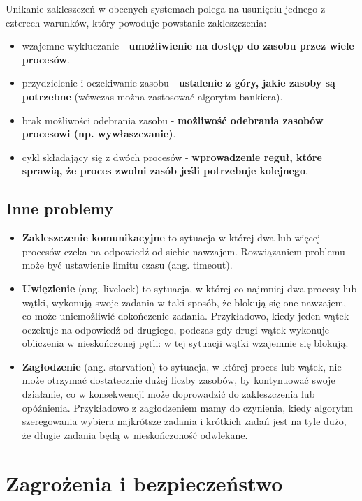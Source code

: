 \documentclass{article}
\begin{document}
Unikanie zakleszczeń w obecnych systemach polega na usunięciu jednego z czterech warunków, który powoduje powstanie zakleszczenia:
\begin{itemize}
    \item wzajemne wykluczanie - \textbf{umożliwienie na dostęp do zasobu przez wiele procesów}.
    \item przydzielenie i oczekiwanie zasobu - \textbf{ustalenie z góry, jakie zasoby są potrzebne} (wówczas można zastosować algorytm bankiera).
    \item brak możliwości odebrania zasobu - \textbf{możliwość odebrania zasobów procesowi (np. wywłaszczanie)}.
    \item cykl składający się z dwóch procesów - \textbf{wprowadzenie reguł, które sprawią, że proces zwolni zasób jeśli potrzebuje kolejnego}.
\end{itemize}

\subsection{Inne problemy}
\begin{itemize}
    \item \textbf{Zakleszczenie komunikacyjne} to sytuacja w której dwa lub więcej procesów czeka na odpowiedź od siebie nawzajem. Rozwiązaniem problemu może być ustawienie limitu czasu (ang. timeout).
    \item \textbf{Uwięzienie} (ang. livelock) to sytuacja, w której co najmniej dwa procesy lub wątki, wykonują swoje zadania w taki sposób, że blokują się one nawzajem, co może uniemożliwić dokończenie zadania. Przykładowo, kiedy jeden wątek oczekuje na odpowiedź od drugiego, podczas gdy drugi wątek wykonuje obliczenia w nieskończonej pętli: w tej sytuacji wątki wzajemnie się blokują.
    \item \textbf{Zagłodzenie} (ang. starvation) to sytuacja, w której proces lub wątek, nie może otrzymać dostatecznie dużej liczby zasobów, by kontynuować swoje działanie, co w konsekwencji może doprowadzić do zakleszczenia lub opóźnienia. Przykładowo z zagłodzeniem mamy do czynienia, kiedy algorytm szeregowania wybiera najkrótsze zadania i krótkich zadań jest na tyle dużo, że długie zadania będą w nieskończoność odwlekane.
\end{itemize}

\section{Zagrożenia i bezpieczeństwo}
\end{document}
